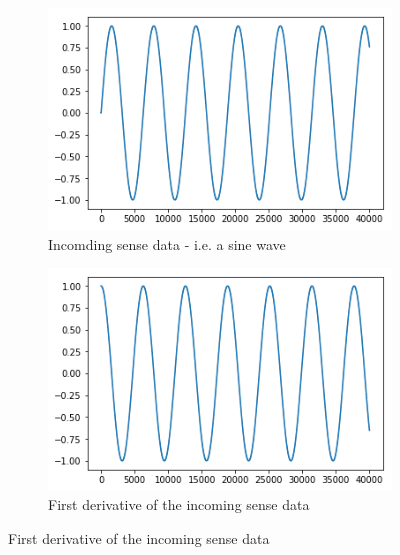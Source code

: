 \begin{figure}[H]
\centering
\begin{subfigure}{.32\linewidth}
 \centering
 \includegraphics[width=0.8\linewidth]{chapter_3_figures/dynamics_sine_wave_phi.png}
 \caption{Incomding sense data - i.e. a sine wave}
\end{subfigure}
 \hfill
\begin{subfigure}{.32\linewidth}
 \centering
 \includegraphics[width=0.8\linewidth]{chapter_3_figures/dynamics_sine_wave_phidot.png}
 \caption{First derivative of the incoming sense data}
\end{subfigure}


\end{figure}
